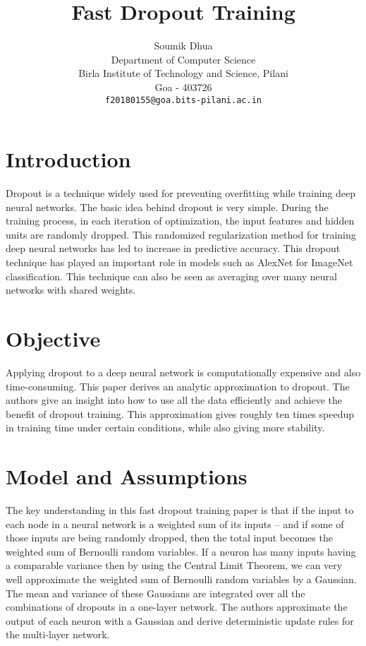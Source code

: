\documentclass{article}
\title{Fast Dropout Training}
\author{
  Soumik Dhua \\
  Department of Computer Science\\
  Birla Institute of Technology and Science, Pilani\\
  Goa - 403726 \\
  \texttt{f20180155@goa.bits-pilani.ac.in} \\
}
\begin{document}
\maketitle






\section{Introduction}
Dropout is a technique widely used for preventing overfitting while training deep neural networks. The basic idea behind dropout is very simple. During the training process, in each iteration of optimization, the input features and hidden units are randomly dropped. This randomized regularization method for training deep neural networks has led to increase in predictive accuracy. This dropout technique has played an important role in models such as AlexNet for ImageNet classification. This technique can also be seen as averaging over many neural networks with shared weights.


\section{Objective}
Applying dropout to a deep neural network is computationally expensive and also time-consuming. This paper derives an analytic approximation to dropout. The authors give an insight into how to use all the data efficiently and achieve the benefit of dropout training. This approximation gives roughly ten times speedup in training time under certain conditions, while also giving more stability.



\section{Model and Assumptions}
The key understanding in this fast dropout training paper is that if the input to each node in a neural network is a weighted sum of its inputs – and if some of those inputs are being randomly dropped, then the total input becomes the weighted sum of Bernoulli random variables.  If a neuron has many inputs having a comparable variance then by using the Central Limit Theorem, we can very well approximate the weighted sum of Bernoulli random variables by a Gaussian. The mean and variance of these Gaussians are integrated over all the combinations of dropouts in a one-layer network.  The authors approximate the output of each neuron with a Gaussian and derive deterministic update rules for the multi-layer network.  
\end{document}
